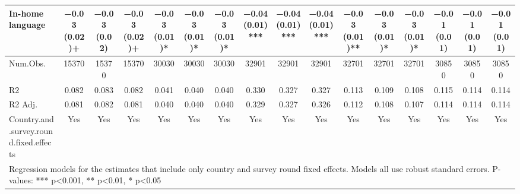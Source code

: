 \begin{table}[H]
\begin{tabular}[t]{lccccccccccccccc}
In-home language & \num{-0.03} (\num{0.02})+ & \num{-0.03} (\num{0.02}) & \num{-0.03} (\num{0.02})+ & \num{-0.03} (\num{0.01})* & \num{-0.03} (\num{0.01})* & \num{-0.03} (\num{0.01})* & \num{-0.04} (\num{0.01})*** & \num{-0.04} (\num{0.01})*** & \num{-0.04} (\num{0.01})*** & \num{-0.03} (\num{0.01})** & \num{-0.03} (\num{0.01})* & \num{-0.03} (\num{0.01})* & \num{-0.01} (\num{0.01}) & \num{-0.01} (\num{0.01}) & \num{-0.01} (\num{0.01})\\
\midrule
Num.Obs. & \num{15370} & \num{15370} & \num{15370} & \num{30030} & \num{30030} & \num{30030} & \num{32901} & \num{32901} & \num{32901} & \num{32701} & \num{32701} & \num{32701} & \num{30850} & \num{30850} & \num{30850}\\
R2 & \num{0.082} & \num{0.083} & \num{0.082} & \num{0.041} & \num{0.040} & \num{0.040} & \num{0.330} & \num{0.327} & \num{0.327} & \num{0.113} & \num{0.109} & \num{0.108} & \num{0.115} & \num{0.114} & \num{0.114}\\
R2 Adj. & \num{0.081} & \num{0.082} & \num{0.081} & \num{0.040} & \num{0.040} & \num{0.040} & \num{0.329} & \num{0.327} & \num{0.326} & \num{0.112} & \num{0.108} & \num{0.107} & \num{0.114} & \num{0.114} & \num{0.114}\\
Country.and.survey.round.fixed.effects & Yes & Yes & Yes & Yes & Yes & Yes & Yes & Yes & Yes & Yes & Yes & Yes & Yes & Yes & Yes\\
\bottomrule
\multicolumn{16}{l}{\rule{0pt}{1em}Regression models for the estimates that include only country and survey round fixed effects. Models all use robust standard errors. P-values: *** p<0.001, ** p<0.01, * p<0.05}\\
\end{tabular}
\end{table}
